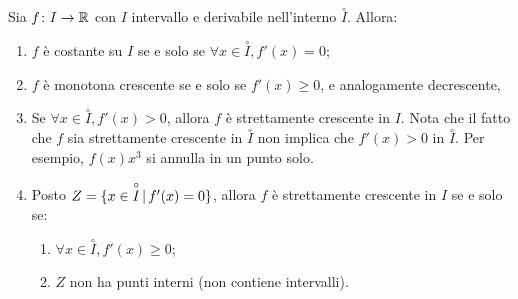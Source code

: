 \documentclass[a4paper]{article}
\begin{document}
\begin{snippettheorem}{}
    Sia \(f\colon I \to \mathbb{R}\) con \(I\) intervallo e derivabile nell'interno \(\overset{\circ}{I}\).
    Allora:
    \begin{enumerate}
        \item \(f\) è costante su \(I\) se e solo se \(\forall x\in \overset{\circ}{I}, f'(x) = 0\);
        \item \(f\) è monotona crescente se e solo se \(f'(x) \geq 0\), e analogamente decrescente,
        \item Se \(\forall x \in \overset{\circ}{I}, f'(x) > 0\), allora \(f\)
        è strettamente crescente in \(I\). Nota che il fatto che \(f\) sia strettamente crescente in \(\overset{\circ}{I}\)
        non implica che \(f'(x)>0\) in \( \overset{\circ}{I}\).
        Per esempio, \(f(x) x^3\) si annulla in un punto solo. 
        \item Posto \(Z = \{x \in \overset{\circ}{I} \,|\, f'(x) = 0\}\), allora \(f\)
        è strettamente crescente in \(I\) se e solo se:
        \begin{enumerate}
            \item \(\forall x \in \overset{\circ}{I}, f'(x) \geq 0\);
            \item \(Z\) non ha punti interni (non contiene intervalli).
        \end{enumerate}
    \end{enumerate}
\end{snippettheorem}
\end{document}
